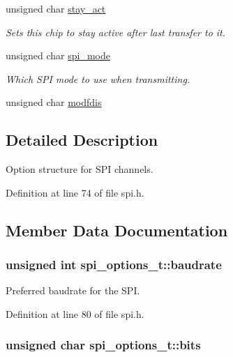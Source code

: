 \begin{DoxyCompactItemize}
unsigned char \hyperlink{structspi__options__t_a7c76c05bc4b82544aabe1d71e68baef1}{stay\+\_\+act}
\begin{DoxyCompactList}\small\item\em Sets this chip to stay active after last transfer to it. \end{DoxyCompactList}\item 
unsigned char \hyperlink{structspi__options__t_a98a1b706e726c41dfb40c2b67719e722}{spi\+\_\+mode}
\begin{DoxyCompactList}\small\item\em Which S\+P\+I mode to use when transmitting. \end{DoxyCompactList}\item 
unsigned char \hyperlink{structspi__options__t_a25aaa6f8b4d65ae291edeb9e4c1c3b57}{modfdis}
\end{DoxyCompactItemize}


\subsection{Detailed Description}
Option structure for S\+P\+I channels. 

Definition at line 74 of file spi.\+h.



\subsection{Member Data Documentation}
\hypertarget{structspi__options__t_a68bf86b07a5c69d257ae8d4a9c307b9e}{}
\subsubsection[{baudrate}]{\setlength{\rightskip}{0pt plus 5cm}unsigned int spi\+\_\+options\+\_\+t\+::baudrate}\label{structspi__options__t_a68bf86b07a5c69d257ae8d4a9c307b9e}


Preferred baudrate for the S\+P\+I. 



Definition at line 80 of file spi.\+h.

\hypertarget{structspi__options__t_afdd53dbfebb4b94e95fa18a8e3037c65}{}
\subsubsection[{bits}]{\setlength{\rightskip}{0pt plus 5cm}unsigned char spi\+\_\+options\+\_\+t\+::bits}\label{structspi__options__t_afdd53dbfebb4b94e95fa18a8e3037c65}


